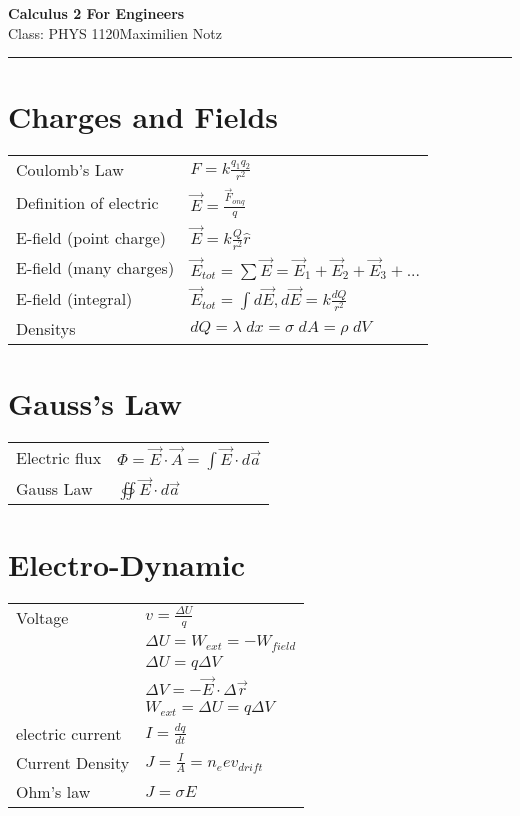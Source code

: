 \documentclass[5pt]{article}
\begin{document}
\begin{center}
     \Large{\textbf{Calculus 2 For Engineers}}\\
     \small{Class: PHYS 1120}\hfill\small{\textcopyright Maximilien Notz \the\year{}}
     \noindent\rule{20.2cm}{0.4pt}
\end{center}


\begin{multicols}{2}
\setcounter{secnumdepth}{0}


\section{Charges and Fields}
\begin{tabular}{ll}
    Coulomb's Law & $F=k\frac{q_1q_2}{r^2}$ \\
    Definition of electric & $\vec{E}=\frac{\vec{F}_{on q}}{q}$\\
    E-field \footnotesize{(point charge)} & $\vec{E}=k\frac{Q}{r^2}\hat{r}$\\
    E-field \footnotesize{(many charges)} & $\vec{E}_{tot}=\sum\vec{E}=\vec{E}_1+\vec{E}_2+\vec{E}_3+...$\\ 
    E-field \footnotesize{(integral)} & $\vec{E}_{tot}=\int d\vec{E}, d\vec{E}=k\frac{dQ}{r^2}$\\
    Densitys & $dQ=\lambda\;dx=\sigma\;dA=\rho\;dV$
\end{tabular}

\section{Gauss's Law}
\begin{tabular}{ll}
Electric flux & $\Phi=\vec{E}\cdot\vec{A}=\int\vec{E}\cdot d\vec{a}$\\
Gauss Law & $\oiint\vec{E}\cdot d\vec{a}$
\end{tabular}
\section{Electro-Dynamic}
\begin{tabular}{ll}
Voltage          & $v=\frac{\Delta U}{q}$\\
                 & $\Delta U = W_{ext}=- W_{field}$\\
                 & $\Delta U = q\Delta V$\\
                 & $\Delta V=-\vec{E}\cdot\Delta\vec{r}$\\
                 & $W_{ext}=\Delta U =q\Delta V$\\
electric current & $I=\frac{dq}{dt}$\\
Current Density  & $J=\frac{I}{A}=n_eev_{drift}$\\
Ohm's law        & $J=\sigma E$
\end{tabular}


\end{multicols}
\end{document}
